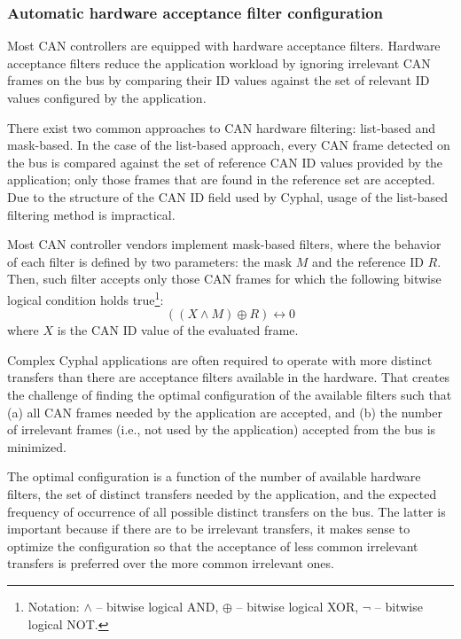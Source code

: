 \subsubsection{Automatic hardware acceptance filter configuration}

\begin{remark}[breakable]
    Most CAN controllers are equipped with hardware acceptance filters.
    Hardware acceptance filters reduce the application workload by ignoring irrelevant CAN frames on the bus
    by comparing their ID values against the set of relevant ID values configured by the application.

    There exist two common approaches to CAN hardware filtering:
    list-based and mask-based.
    In the case of the list-based approach, every CAN frame detected on the bus is compared
    against the set of reference CAN ID values provided by the application;
    only those frames that are found in the reference set are accepted.
    Due to the structure of the CAN ID field used by Cyphal,
    usage of the list-based filtering method is impractical.

    Most CAN controller vendors implement mask-based filters,
    where the behavior of each filter is defined by two parameters: the mask $M$ and the reference ID $R$.
    Then, such filter accepts only those CAN frames for which the following bitwise logical condition holds
    true\footnote{Notation: $\land$ -- bitwise logical AND, $\oplus$ -- bitwise logical XOR,
    $\neg$ -- bitwise logical NOT.}:
    $$((X \land M) \oplus R) \leftrightarrow 0$$
    where $X$ is the CAN ID value of the evaluated frame.

    Complex Cyphal applications are often required to operate with more distinct transfers than there are
    acceptance filters available in the hardware.
    That creates the challenge of finding the optimal configuration of the available filters such that
    (a) all CAN frames needed by the application are accepted, and
    (b) the number of irrelevant frames (i.e., not used by the application) accepted from the bus is minimized.

    The optimal configuration is a function of the number of available hardware filters,
    the set of distinct transfers needed by the application,
    and the expected frequency of occurrence of all possible distinct transfers on the bus.
    The latter is important because if there are to be irrelevant transfers,
    it makes sense to optimize the configuration so that the acceptance of less common irrelevant transfers
    is preferred over the more common irrelevant ones.


\end{remark}
